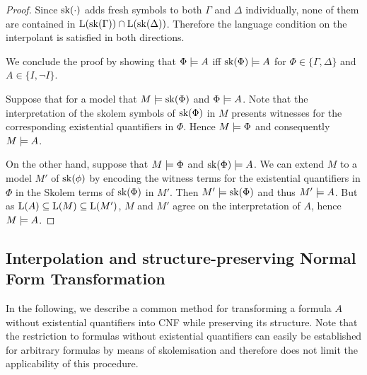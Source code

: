 \begin{proof}
	Since $\operatorname{sk}(\cdot)$ adds fresh symbols to both $\Gamma$ and $\Delta$ individually,
	none of them are contained in $\operatorname{L}(\operatorname{sk}(\Gamma)) \cap \operatorname{L}(\operatorname{sk}(\Delta))$.
	Therefore the language condition on the interpolant is satisfied in both directions.



	We conclude the proof by showing that $\Phi \models A$ iff $\operatorname{sk}(\Phi) \models A$ for $\Phi \in \{\Gamma, \Delta\}$ and $A \in \{I, \lnot I\}$.

	Suppose that for a model that $M \models \operatorname{sk}(\Phi)$ and $\Phi \models A$.
	Note that the interpretation of the skolem symbols of $\operatorname{sk}(\Phi)$ in $M$ presents witnesses for the corresponding existential quantifiers in $\Phi$.
	Hence $M \models \Phi$ and consequently $M\models A$.

	On the other hand, suppose that $M \models \Phi$ and $\operatorname{sk}(\Phi) \models A$.
	We can extend $M$ to a model $M'$ of $\operatorname{sk}(\phi)$ by encoding the witness terms for the existential quantifiers in $\Phi$ in the Skolem terms of $\operatorname{sk}(\Phi)$ in $M'$.
	Then $M' \models \operatorname{sk}(\Phi)$ and thus $M' \models A$.
	But as $\operatorname{L}(A) \subseteq \operatorname{L}(M) \subseteq \operatorname{L}(M')$, $M$ and $M'$ agree on the interpretation of $A$, hence $M \models A$.
\end{proof}


\subsection{Interpolation and structure-preserving Normal Form Transformation}

In the following, we describe a common method for transforming a formula $A$ without existential quantifiers into CNF while preserving its structure.
Note that the restriction to formulas without existential quantifiers can easily be established for arbitrary formulas by means of skolemisation and therefore does not limit the applicability of this procedure.

